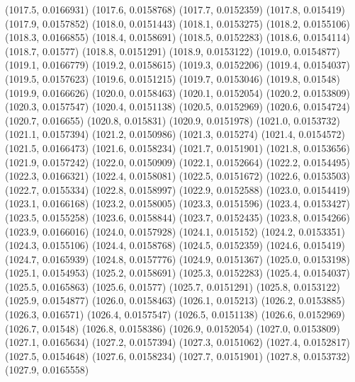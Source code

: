 {					(1017.5, 0.0166931)
					(1017.6, 0.0158768)
					(1017.7, 0.0152359)
					(1017.8, 0.015419)
					(1017.9, 0.0157852)
					(1018.0, 0.0151443)
					(1018.1, 0.0153275)
					(1018.2, 0.0155106)
					(1018.3, 0.0166855)
					(1018.4, 0.0158691)
					(1018.5, 0.0152283)
					(1018.6, 0.0154114)
					(1018.7, 0.01577)
					(1018.8, 0.0151291)
					(1018.9, 0.0153122)
					(1019.0, 0.0154877)
					(1019.1, 0.0166779)
					(1019.2, 0.0158615)
					(1019.3, 0.0152206)
					(1019.4, 0.0154037)
					(1019.5, 0.0157623)
					(1019.6, 0.0151215)
					(1019.7, 0.0153046)
					(1019.8, 0.01548)
					(1019.9, 0.0166626)
					(1020.0, 0.0158463)
					(1020.1, 0.0152054)
					(1020.2, 0.0153809)
					(1020.3, 0.0157547)
					(1020.4, 0.0151138)
					(1020.5, 0.0152969)
					(1020.6, 0.0154724)
					(1020.7, 0.016655)
					(1020.8, 0.015831)
					(1020.9, 0.0151978)
					(1021.0, 0.0153732)
					(1021.1, 0.0157394)
					(1021.2, 0.0150986)
					(1021.3, 0.015274)
					(1021.4, 0.0154572)
					(1021.5, 0.0166473)
					(1021.6, 0.0158234)
					(1021.7, 0.0151901)
					(1021.8, 0.0153656)
					(1021.9, 0.0157242)
					(1022.0, 0.0150909)
					(1022.1, 0.0152664)
					(1022.2, 0.0154495)
					(1022.3, 0.0166321)
					(1022.4, 0.0158081)
					(1022.5, 0.0151672)
					(1022.6, 0.0153503)
					(1022.7, 0.0155334)
					(1022.8, 0.0158997)
					(1022.9, 0.0152588)
					(1023.0, 0.0154419)
					(1023.1, 0.0166168)
					(1023.2, 0.0158005)
					(1023.3, 0.0151596)
					(1023.4, 0.0153427)
					(1023.5, 0.0155258)
					(1023.6, 0.0158844)
					(1023.7, 0.0152435)
					(1023.8, 0.0154266)
					(1023.9, 0.0166016)
					(1024.0, 0.0157928)
					(1024.1, 0.015152)
					(1024.2, 0.0153351)
					(1024.3, 0.0155106)
					(1024.4, 0.0158768)
					(1024.5, 0.0152359)
					(1024.6, 0.015419)
					(1024.7, 0.0165939)
					(1024.8, 0.0157776)
					(1024.9, 0.0151367)
					(1025.0, 0.0153198)
					(1025.1, 0.0154953)
					(1025.2, 0.0158691)
					(1025.3, 0.0152283)
					(1025.4, 0.0154037)
					(1025.5, 0.0165863)
					(1025.6, 0.01577)
					(1025.7, 0.0151291)
					(1025.8, 0.0153122)
					(1025.9, 0.0154877)
					(1026.0, 0.0158463)
					(1026.1, 0.015213)
					(1026.2, 0.0153885)
					(1026.3, 0.016571)
					(1026.4, 0.0157547)
					(1026.5, 0.0151138)
					(1026.6, 0.0152969)
					(1026.7, 0.01548)
					(1026.8, 0.0158386)
					(1026.9, 0.0152054)
					(1027.0, 0.0153809)
					(1027.1, 0.0165634)
					(1027.2, 0.0157394)
					(1027.3, 0.0151062)
					(1027.4, 0.0152817)
					(1027.5, 0.0154648)
					(1027.6, 0.0158234)
					(1027.7, 0.0151901)
					(1027.8, 0.0153732)
					(1027.9, 0.0165558)
}
